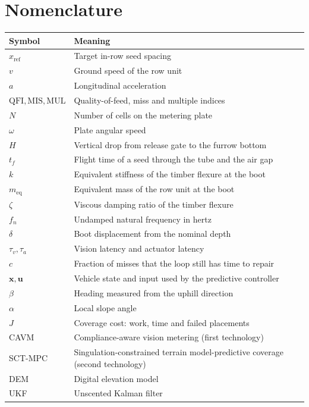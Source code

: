 \documentclass[12pt,a4paper]{report}
\newcommand{\qfi}{\mathrm{QFI}}
\newcommand{\mis}{\mathrm{MIS}}
\newcommand{\mul}{\mathrm{MUL}}
\begin{document}
\tableofcontents
\listoffigures
\listoftables

\chapter*{Nomenclature}
\begin{longtable}{@{}lp{}@{}}
\toprule
Symbol & Meaning \\
\midrule
\endhead
$x_{\mathrm{ref}}$ & Target in-row seed spacing \\
$v$ & Ground speed of the row unit \\
$a$ & Longitudinal acceleration \\
$\qfi,\mis,\mul$ & Quality-of-feed, miss and multiple indices \\
$N$ & Number of cells on the metering plate \\
$\omega$ & Plate angular speed \\
$H$ & Vertical drop from release gate to the furrow bottom \\
$t_f$ & Flight time of a seed through the tube and the air gap \\
$k$ & Equivalent stiffness of the timber flexure at the boot \\
$m_{\mathrm{eq}}$ & Equivalent mass of the row unit at the boot \\
$\zeta$ & Viscous damping ratio of the timber flexure \\
$f_n$ & Undamped natural frequency in hertz \\
$\delta$ & Boot displacement from the nominal depth \\
$\tau_v,\tau_a$ & Vision latency and actuator latency \\
$c$ & Fraction of misses that the loop still has time to repair \\
$\mathbf{x},\mathbf{u}$ & Vehicle state and input used by the predictive controller \\
$\beta$ & Heading measured from the uphill direction \\
$\alpha$ & Local slope angle \\
$J$ & Coverage cost: work, time and failed placements \\
CAVM & Compliance-aware vision metering (first technology) \\
SCT-MPC & Singulation-constrained terrain model-predictive coverage (second technology) \\
DEM & Digital elevation model \\
UKF & Unscented Kalman filter \\
\bottomrule
\end{longtable}






\end{document}
